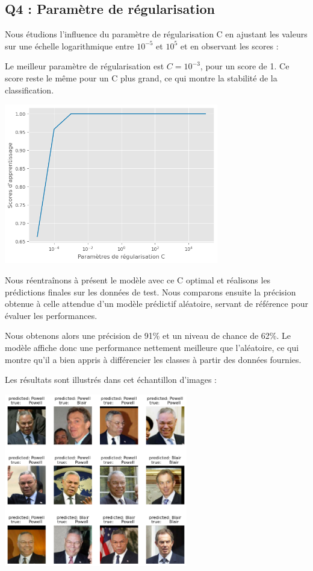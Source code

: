 \documentclass{scrartcl}
\begin{document}
\subsection{Q4 : Paramètre de régularisation}
\hspace{7pt} Nous étudions l'influence du paramètre de régularisation C en ajustant les valeurs sur une échelle logarithmique entre $10^{-5}$ et $10^5$ et en observant les scores :\newline

Le meilleur paramètre de régularisation est $C = 10^{-3}$, pour un score de 1. Ce score reste le même pour un C plus grand, ce qui montre la stabilité de la classification.\newline

\begin{center}
    \includegraphics[width=0.7\textwidth]{../images/classification.png}
\end{center}

Nous réentraînons à présent le modèle avec ce C optimal et réalisons les prédictions finales sur les données de test. Nous comparons ensuite la précision obtenue à celle attendue d'un modèle prédictif aléatoire, servant de référence pour évaluer les performances.\newline

Nous obtenons alors une précision de 91\% et un niveau de chance de 62\%. Le modèle affiche donc une performance nettement meilleure que l'aléatoire, ce qui montre qu'il a bien appris à différencier les classes à partir des données fournies.\newline

Les résultats sont illustrés dans cet échantillon d'images :

\begin{center}
    \includegraphics[width=0.6\textwidth]{../images/TB-CPpred.png}
\end{center}
\end{document}
